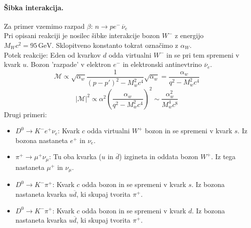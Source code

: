 \documentclass[a4paper]{article}
\newcommand{\anti}[1]{\overline{#1}}
\begin{document}
\paragraph{Šibka interakcija.} Za primer vzemimo razpad $\beta$: $n \to p e^- \,\overline{\nu}_e$ \\
Pri opisani reakciji je nosilec šibke interakcije bozon \(W^-\) z energijo \(M_{W}c^2 = 95\,\mathrm{GeV}\). Sklopitveno konstanto tokrat označimo
z \(\alpha_W\). \\[3mm]
Potek reakcije: Eden od kvarkov \(d\) odda virtualni \(W^-\) in se pri tem spremeni v kvark \(u\). Bozon 'razpade' v elektron \(e^-\) in elektronski antinevtrino \(\overline{\nu}_e\).
$$\mathcal{M} \propto \sqrt{\alpha_w}\frac{1}{(p-p')^2 - M_w^2c^4}\sqrt{\alpha_w} = \frac{\alpha_w}{q^2-M_w^2c^4}$$
$$|\mathcal{M}|^2 \propto \alpha^2 \left(\frac{\alpha_w}{q^2-M_w^2c^4}\right)^2 \sim \frac{\alpha_w^2}{M_w^4c^8}$$
Drugi primeri: \\
\begin{itemize}
    \item \(D^0 \to K^-e^+\nu_e\): Kvark \(c\) odda virtualni \(W^+\) bozon in se spremeni v kvark \(s\). Iz bozona nastaneta \(e^+\) in \(\nu_e\).
    \item \(\pi^+ \to \mu^+\nu_\mu\): Tu oba kvarka (\(u\) in \(\overline{d}\)) izgineta in oddata bozon \(W^+\). Iz tega nastaneta \(\mu^+\) in \(\nu_\mu\).
    \item \(D^0 \to K^-\pi^+\): Kvark \(c\) odda bozon in se spremeni v kvark \(s\). Iz bozona nastaneta kvarka \(u\anti{d}\), ki skupaj tvorita \(\pi^+\).
    \item \(D^0 \to K^-\pi^+\): Kvark \(c\) odda bozon in se spremeni v kvark \(d\). Iz bozona nastaneta kvarka \(u\anti{d}\), ki skupaj tvorita \(\pi^+\).
\end{itemize}
\end{document}
